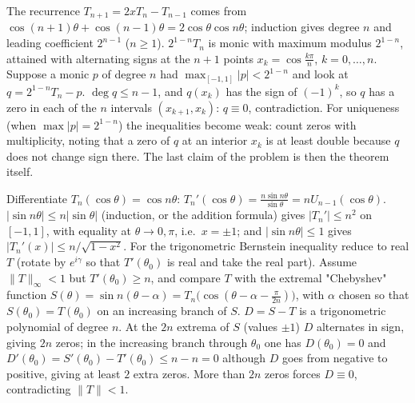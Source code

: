 \documentclass[11pt,a4paper]{article}
\begin{document}

 The recurrence $T_{n+1}=2xT_n-T_{n-1}$ comes from $\cos(n+1)\theta+\cos(n-1)\theta=2\cos\theta\cos n\theta$; induction gives degree $n$ and leading coefficient $2^{n-1}$ ($n\ge1$).
 $2^{1-n}T_n$ is monic with maximum modulus $2^{1-n}$, attained with alternating signs at the $n+1$ points $x_k=\cos\frac{k\pi}n$, $k=0,\dots,n$. Suppose a monic $p$ of degree $n$ had $\max_{[-1,1]}|p|<2^{1-n}$ and look at $q=2^{1-n}T_n-p$.
 $\deg q\le n-1$, and $q(x_k)$ has the sign of $(-1)^k$, so $q$ has a zero in each of the $n$ intervals $(x_{k+1},x_k)$: $q\equiv0$, contradiction. For uniqueness (when $\max|p|=2^{1-n}$) the inequalities become weak: count zeros with multiplicity, noting that a zero of $q$ at an interior $x_k$ is at least double because $q$ does not change sign there. The last claim of the problem is then the theorem itself.

 Differentiate $T_n(\cos\theta)=\cos n\theta$: $T_n'(\cos\theta)=\frac{n\sin n\theta}{\sin\theta}=nU_{n-1}(\cos\theta)$.
 $|\sin n\theta|\le n|\sin\theta|$ (induction, or the addition formula) gives $|T_n'|\le n^2$ on $[-1,1]$, with equality at $\theta\to0,\pi$, i.e.\ $x=\pm1$; and $|\sin n\theta|\le1$ gives $|T_n'(x)|\le n/\sqrt{1-x^2}$.
 For the trigonometric Bernstein inequality reduce to real $T$ (rotate by $e^{i\gamma}$ so that $T'(\theta_0)$ is real and take the real part). Assume $\|T\|_\infty<1$ but $T'(\theta_0)\ge n$, and compare $T$ with the extremal "Chebyshev" function $S(\theta)=\sin n(\theta-\alpha)=T_n\bigl(\cos(\theta-\alpha-\frac\pi{2n})\bigr)$, with $\alpha$ chosen so that $S(\theta_0)=T(\theta_0)$ on an increasing branch of $S$.
 $D=S-T$ is a trigonometric polynomial of degree $n$. At the $2n$ extrema of $S$ (values $\pm1$) $D$ alternates in sign, giving $2n$ zeros; in the increasing branch through $\theta_0$ one has $D(\theta_0)=0$ and $D'(\theta_0)=S'(\theta_0)-T'(\theta_0)\le n-n=0$ although $D$ goes from negative to positive, giving at least $2$ extra zeros. More than $2n$ zeros forces $D\equiv0$, contradicting $\|T\|<1$.
\end{document}

